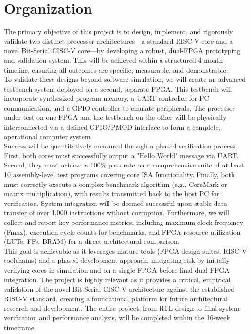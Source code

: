 \documentclass[10pt,twocolumn]{article}
\begin{document}
\section{Organization}
The primary objective of this project is to design, implement, and rigorously validate two distinct processor architectures—a standard RISC-V core and a novel Bit-Serial CISC-V core—by developing a robust, dual-FPGA prototyping and validation system. This will be achieved within a structured 4-month timeline, ensuring all outcomes are specific, measurable, and demonstrable.\\
To validate these designs beyond software simulation, we will create an advanced testbench system deployed on a second, separate FPGA. This testbench will incorporate synthesized program memory, a UART controller for PC communication, and a GPIO controller to emulate peripherals. The processor-under-test on one FPGA and the testbench on the other will be physically interconnected via a defined GPIO/PMOD interface to form a complete, operational computer system.\\
Success will be quantitatively measured through a phased verification process. First, both cores must successfully output a "Hello World" message via UART. Second, they must achieve a 100\% pass rate on a comprehensive suite of at least 10 assembly-level test programs covering core ISA functionality. Finally, both must correctly execute a complex benchmark algorithm (e.g., CoreMark or matrix multiplication), with results transmitted back to the host PC for verification. System integration will be deemed successful upon stable data transfer of over 1,000 instructions without corruption. Furthermore, we will collect and report key performance metrics, including maximum clock frequency (Fmax), execution cycle counts for benchmarks, and FPGA resource utilization (LUTs, FFs, BRAM) for a direct architectural comparison.\\
This goal is achievable as it leverages mature tools (FPGA design suites, RISC-V toolchains) and a phased development approach, mitigating risk by initially verifying cores in simulation and on a single FPGA before final dual-FPGA integration. The project is highly relevant as it provides a critical, empirical validation of the novel Bit-Serial CISC-V architecture against the established RISC-V standard, creating a foundational platform for future architectural research and development. The entire project, from RTL design to final system verification and performance analysis, will be completed within the 16-week timeframe.
\end{document}
